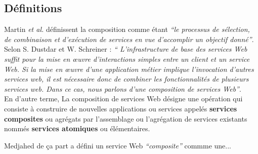     \subsection{Définitions}
    \label{sec:definitions}

    Martin \emph{et al.} \cite{martin2004owl} définissent
    la composition comme étant \emph{``le processus de sélection, de
      combinaison et d'exécution de services en vue
      d'accomplir un objectif donné''}.\\

    Selon S. Dustdar et W. Schreiner \cite{dustdar2005survey} :
    \emph{`` L'infrastructure de base des services Web suffit pour la
      mise en œuvre d'interactions simples entre un client et un
      service Web. Si la mise en œuvre d'une application métier
      implique l'invocation d'autres services web, il est nécessaire
      donc de combiner les fonctionnalités de plusieurs services
      web. Dans ce cas, nous parlons d'une composition de services
      Web''}.\\

    En d'autre terme, La composition de services Web désigne une
    opération qui consiste à construire de nouvelles applications ou
    services appelés \textbf{services composites} ou agrégats par
    l'assemblage ou l'agrégation de services existants nommés
    \textbf{services atomiques} ou élémentaires.

    Medjahed \cite{medjahed2004thesis}de ça part a défini un service
    Web \emph{``composite''} commme une...\\%
    

